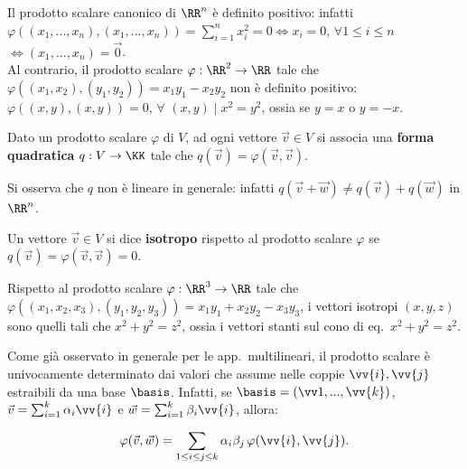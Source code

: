 \documentclass[11pt]{article}
\begin{document}
	\begin{example}
		Il prodotto scalare canonico di $\RR^n$ è definito positivo: infatti $\varphi((x_1, ..., x_n), (x_1, ..., x_n)) =
		\sum_{i=1}^n x_i^2  = 0 \iff x_i = 0$, $\forall 1 \leq i \leq n$ $\iff (x_1, ..., x_n) = \vec{0}$. \\
		
		Al contrario, il prodotto scalare $\varphi : \RR^2 \to \RR$ tale che $\varphi((x_1, x_2), (y_1, y_2)) = x_1 y_1 - x_2 y_2$ non è definito positivo: $\varphi((x, y), (x, y)) = 0$, $\forall$ $(x, y) \mid x^2 = y^2$, ossia se
		$y = x$ o $y = -x$.
	\end{example}

	\begin{definition}
		Dato un prodotto scalare $\varphi$ di $V$, ad ogni vettore $\vec{v} \in V$ si associa una \textbf{forma quadratica}
		$q : V \to \KK$ tale che $q(\vec{v}) = \varphi(\vec{v}, \vec{v})$.
	\end{definition}

	\begin{remark}
		Si osserva che $q$ non è lineare in generale: infatti $q(\vec{v} + \vec{w}) \neq q(\vec{v}) + q(\vec{w})$ in
		$\RR^n$.
	\end{remark}

	\begin{definition}
		Un vettore $\vec{v} \in V$ si dice \textbf{isotropo} rispetto al prodotto scalare $\varphi$ se $q(\vec{v}) =
		\varphi(\vec{v}, \vec{v}) = 0$.
	\end{definition}

	\begin{example}
		Rispetto al prodotto scalare $\varphi : \RR^3 \to \RR$ tale che $\varphi((x_1, x_2, x_3), (y_1, y_2, y_3)) =
		x_1 y_1 + x_2 y_2 - x_3 y_3$, i vettori isotropi $(x, y, z)$ sono quelli tali che $x^2 + y^2 = z^2$, ossia
		i vettori stanti sul cono di eq.~$x^2 + y^2 = z^2$.
	\end{example}

	\begin{remark}
		Come già osservato in generale per le app.~multilineari, il prodotto scalare è univocamente determinato
		dai valori che assume nelle coppie $\vv{i}, \vv{j}$ estraibili da una base $\basis$. Infatti, se
		$\basis = (\vv1, ..., \vv{k})$, $\vec{v} = \sum_{i=1}^k \alpha_i \vv{i}$ e $\vec{w} = \sum_{i=1}^k \beta_i \vv{i}$,
		allora:
		
		\[ \varphi(\vec{v}, \vec{w}) = \sum_{1 \leq i \leq j \leq k} \alpha_i \beta_j \, \varphi(\vv{i}, \vv{j}). \]
	\end{remark}
\end{document}
